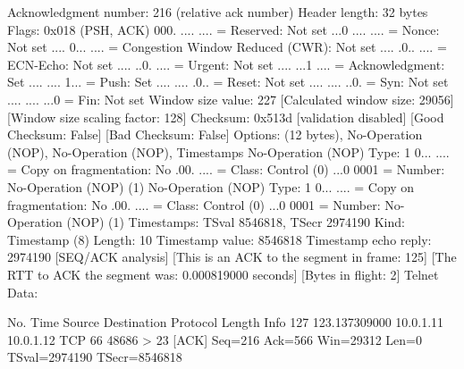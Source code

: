     Acknowledgment number: 216    (relative ack number)
    Header length: 32 bytes
    Flags: 0x018 (PSH, ACK)
        000. .... .... = Reserved: Not set
        ...0 .... .... = Nonce: Not set
        .... 0... .... = Congestion Window Reduced (CWR): Not set
        .... .0.. .... = ECN-Echo: Not set
        .... ..0. .... = Urgent: Not set
        .... ...1 .... = Acknowledgment: Set
        .... .... 1... = Push: Set
        .... .... .0.. = Reset: Not set
        .... .... ..0. = Syn: Not set
        .... .... ...0 = Fin: Not set
    Window size value: 227
    [Calculated window size: 29056]
    [Window size scaling factor: 128]
    Checksum: 0x513d [validation disabled]
        [Good Checksum: False]
        [Bad Checksum: False]
    Options: (12 bytes), No-Operation (NOP), No-Operation (NOP), Timestamps
        No-Operation (NOP)
            Type: 1
                0... .... = Copy on fragmentation: No
                .00. .... = Class: Control (0)
                ...0 0001 = Number: No-Operation (NOP) (1)
        No-Operation (NOP)
            Type: 1
                0... .... = Copy on fragmentation: No
                .00. .... = Class: Control (0)
                ...0 0001 = Number: No-Operation (NOP) (1)
        Timestamps: TSval 8546818, TSecr 2974190
            Kind: Timestamp (8)
            Length: 10
            Timestamp value: 8546818
            Timestamp echo reply: 2974190
    [SEQ/ACK analysis]
        [This is an ACK to the segment in frame: 125]
        [The RTT to ACK the segment was: 0.000819000 seconds]
        [Bytes in flight: 2]
Telnet
    Data: 

No.     Time           Source                Destination           Protocol Length Info
    127 123.137309000  10.0.1.11             10.0.1.12             TCP      66     48686 > 23 [ACK] Seq=216 Ack=566 Win=29312 Len=0 TSval=2974190 TSecr=8546818

